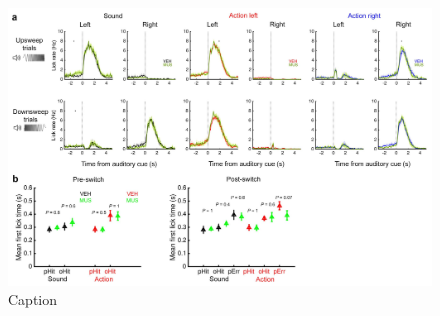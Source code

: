 \begin{figure}[htbp]

\begin{center}
\includegraphics[width=\textwidth]{Figures/NN_figS5.jpg} 
\end{center}

\caption[M2 inactivation does not affect mean lick rate or response time]
{Caption}

\label{fig:NN_figS5}
\end{figure}